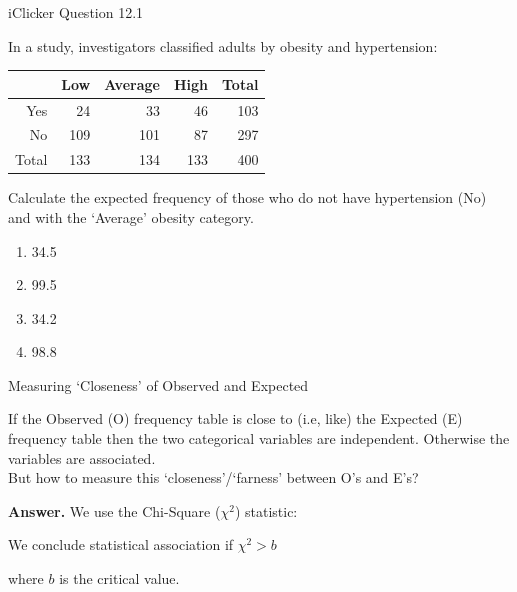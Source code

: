 \documentclass[14pt]{beamer}\usepackage[]{graphicx}\usepackage[]{color}
\begin{document}
\begin{frame}[fragile]{iClicker Question 12.1}

{\small{
In a study, investigators classified adults by obesity and hypertension:

\begin{table}[ht]
\centering
\begin{tabular}{rrrrr}
  \hline
 & Low & Average & High & Total \\ 
  \hline
Yes & 24 & 33 & 46 & 103 \\ 
  No & 109 & 101 & 87 & 297 \\ 
  Total & 133 & 134 & 133 & 400 \\ 
   \hline
\end{tabular}
\end{table}


Calculate the expected frequency of those who do not have  hypertension (No) and with the `Average' obesity category.

\begin{enumerate}
\item 34.5
\item 99.5
\item 34.2
\item 98.8
\end{enumerate}
}}
\end{frame}

\begin{frame}[fragile]{Measuring `Closeness' of Observed and Expected}

If the Observed (O) frequency table is close to (i.e, like) the Expected
(E) frequency table then the two categorical variables are independent.  Otherwise the variables are associated. \\
But how to measure this `closeness'/`farness' between O's and E's?

\vspace{3mm}

\textbf{Answer.}  We use the Chi-Square ($\chi^2$) statistic:

\vspace{3mm}

We conclude statistical association if $\chi^2 > b$ 

where $b$ is the critical value.

\end{frame}
\end{document}
